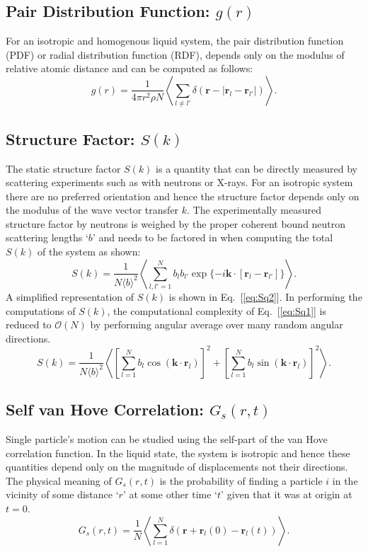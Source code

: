 \documentclass{article}
\begin{document}
\subsection{Pair Distribution Function: $g(r)$} \label{sec::gofr}
For an isotropic and homogenous liquid system, the pair distribution function (PDF) or radial distribution function (RDF), depends only on the modulus of relative atomic distance and can be computed as follows:
\begin{equation}
g(r) = \frac{1}{4\pi r^2\rho N}\left\langle\sum\limits_{l\neq l'} \delta(\mathbf{r}-|\mathbf{r}_l-\mathbf{r}_{l'}|)\right\rangle.
\end{equation}

\subsection{Structure Factor: $S(k)$} \label{sec::sofk}
The static structure factor $S(k)$ is a quantity that can be directly measured by scattering experiments such as with neutrons or X-rays. For an isotropic system there are no preferred orientation and hence the structure factor depends only on the modulus of the wave vector transfer $k$. The experimentally measured structure factor by neutrons is weighed by the proper coherent bound neutron scattering lengths `$b$' and needs to be factored in when computing the total $S(k)$ of the system as shown:
\begin{equation}
\label{eq:Sq1}
S(k) = \frac{1}{N\langle b\rangle^2}\left\langle\sum_{l,l'=1}^{N} b_lb_{l'}\exp{\{-i\mathbf{k}\cdot[\mathbf{r}_l - \mathbf{r}_{l'}]\}}\right\rangle.
\end{equation}
A simplified representation of $S(k)$ is shown in Eq.~[\ref{eq:Sq2}]. In performing the computations of $S(k)$, the computational complexity of Eq.~[\ref{eq:Sq1}] is reduced to $\mathcal{O}(N)$ by performing angular average over many random angular directions.
\begin{equation}
\label{eq:Sq2}
S(k) = \frac{1}{N\langle b\rangle^2}\left\langle\left[\sum_{l=1}^{N} b_l\cos(\mathbf{k}\cdot\mathbf{r}_l)\right]^2+\left[\sum_{l=1}^{N} b_l\sin(\mathbf{k}\cdot\mathbf{r}_l)\right]^2\right\rangle.
\end{equation} 

\subsection{Self van Hove Correlation: $G_s(r,t)$} \label{sec::Gofrt}
Single particle's motion can be studied using the self-part of the van Hove correlation function. In the liquid state, the system is isotropic and hence these quantities depend only on the magnitude of displacements not their directions. The physical meaning of $G_s(r,t)$ is the probability of finding a particle $i$ in the vicinity of some distance `$r$' at some other time `$t$' given that it was at origin at $t = 0$.
\begin{equation}
\label{eq:gr}
G_s(r,t) = \frac{1}{N}\left\langle\sum\limits_{l=1}^N \delta(\mathbf{r}+\mathbf{r}_l(0)-\mathbf{r}_l(t))\right\rangle.
\end{equation}
\end{document}
